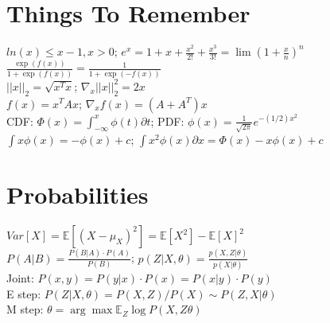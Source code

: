 \section*{Things To Remember}
$ln(x) \leq x - 1, x>0$; $e^x=1+x+\frac{x^2}{2!}+\frac{x^3}{3!}=\lim (1+\frac{x}{n})^n$\\
$\frac{\exp(f(x))}{1+\exp(f(x))}=\frac{1}{1+\exp(-f(x))}$\\
$||x||_2 = \sqrt{x^T x}$; $\nabla_x ||x||_2^2 = 2 x$\\
$f(x) = x^T A x$; $\nabla_x f(x) = (A + A^T) x$\\


CDF: $\Phi(x) = \int_{-\infty}^{x} \phi(t) \partial t$;  PDF: $\phi(x) = \frac{1}{\sqrt{2\pi}} e^{-(1/2)x^2}$\\
$\int x \phi(x) = -\phi(x) + c$; $\int x^2 \phi(x) \partial x = \Phi(x) -x \phi(x) + c$

\section*{Probabilities}
$Var[X] = \mathbb{E}[(X-\mu_X)^2] = \mathbb{E}[X^2] - \mathbb{E}[X]^2$\\
$P(A|B) = \frac{P(B|A) \cdot P(A)}{P(B)}$; $p(Z|X,\theta) = \frac{p(X,Z|\theta)}{p(X|\theta)}$\\
Joint: $P(x,y)= P(y|x) \cdot P(x) = P(x|y) \cdot P(y)$\\
E step: $P(Z|X,\theta)=P(X,Z)/P(X) \sim P(Z,X|\theta)$\\
M step: $\theta = \arg\max \mathds{E}_Z\log P(X,Z\theta)$\\

